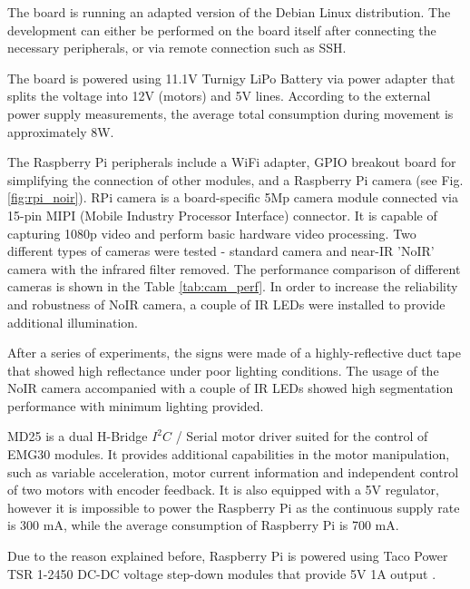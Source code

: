 The board is running an adapted version of the Debian Linux distribution. The
development can either be performed on the board itself after connecting the
necessary peripherals, or via remote connection such as SSH.

The board is powered using 11.1V Turnigy LiPo Battery via power adapter that
splits the voltage into 12V (motors) and 5V lines. According to the external
power supply measurements, the average total consumption during movement is
approximately 8W.

The Raspberry Pi peripherals include a WiFi adapter, GPIO breakout board for
simplifying the connection of other modules, and a Raspberry Pi camera (see
Fig. \ref{fig:rpi_noir}).
RPi camera is a board-specific 5Mp camera module connected via 15-pin MIPI (Mobile Industry
Processor Interface) connector. It is capable of capturing 1080p video and
perform basic hardware video processing. Two different types of cameras were
tested - standard camera and near-IR 'NoIR' camera with the infrared filter
removed.
The performance comparison of different cameras is shown in the Table
\ref{tab:cam_perf}.  In order to increase the reliability and robustness of 
NoIR camera, a couple of IR LEDs were installed to provide additional illumination.

After a series of experiments, the signs were made of a highly-reflective duct
tape that showed high reflectance under poor lighting
conditions. The usage of the NoIR camera accompanied with a couple of IR LEDs
showed high segmentation performance with minimum lighting provided.

MD25 is a dual H-Bridge $I^2C$ / Serial motor driver suited for the control of
EMG30 modules.
It provides additional capabilities in the motor manipulation, such as variable
acceleration, motor current information and independent control of two motors
with encoder feedback. It is also equipped with a 5V regulator, however it is
impossible to power the Raspberry Pi as the continuous supply rate is 300 mA,
while the average consumption of Raspberry Pi is 700 mA.

Due to the reason explained before, Raspberry Pi is powered using Taco Power TSR
1-2450 DC-DC voltage step-down modules that provide 5V 1A output \cite{taco}.

